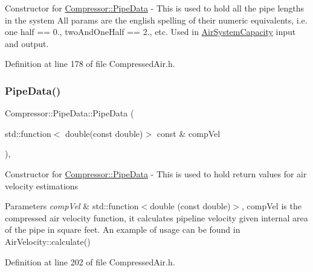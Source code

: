Constructor for \hyperlink{struct_compressor_1_1_pipe_data}{Compressor\+::\+Pipe\+Data} -\/ This is used to hold all the pipe lengths in the system All params are the english spelling of their numeric equivalents, i.\+e. one half == 0., two\+And\+One\+Half == 2., etc. Used in \hyperlink{class_compressor_1_1_air_system_capacity}{Air\+System\+Capacity} input and output. 

Definition at line 178 of file Compressed\+Air.\+h.

\mbox{\label{struct_compressor_1_1_pipe_data_af7998fd533340b0a84e78fcda91b4806}} 
\subsubsection{\texorpdfstring{Pipe\+Data()}{PipeData()}\hspace{0.1cm}{\footnotesize\ttfamily [2/6]}}
{\footnotesize\ttfamily Compressor\+::\+Pipe\+Data\+::\+Pipe\+Data (\begin{DoxyParamCaption}\item[{std\+::function$<$ double(const double)$>$ const \&}]{comp\+Vel }\end{DoxyParamCaption})\hspace{0.3cm}{\ttfamily [inline]}, {\ttfamily [explicit]}}

Constructor for \hyperlink{struct_compressor_1_1_pipe_data}{Compressor\+::\+Pipe\+Data} -\/ This is used to hold return values for air velocity estimations 
\begin{DoxyParams}{Parameters}
{\em comp\+Vel} & std\+::function$<$double (const double)$>$, comp\+Vel is the compressed air velocity function, it calculates pipeline velocity given internal area of the pipe in square feet. An example of usage can be found in Air\+Velocity\+::calculate() \\
\hline
\end{DoxyParams}


Definition at line 202 of file Compressed\+Air.\+h.

\mbox{\label{struct_compressor_1_1_pipe_data_a2eb8afee8f68dd54dd1bf4d89b3188d9}} 

